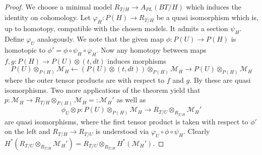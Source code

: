 \documentclass[12pt,a4paper]{article}
\theoremstyle{definition}
\begin{document}
\begin{proof}
We choose a minimal model $R_{T/H}\rightarrow A_{PL}(BT/H)$ which induces the identity on cohomology. Let $\varphi_H\colon P(H)\rightarrow R_{T/H}$ be a quasi isomorphism which is, up to homotopy, compatible with the chosen models. It admits a section $\psi_H$. Define $\varphi_U$ analogously. We note that the given map $\phi\colon P(U)\rightarrow P(H)$ is homotopic to $\phi'=\phi\circ\psi_H\circ\varphi_H$.
Now any homotopy between maps $f,g\colon P(H)\rightarrow P(U)\otimes (t,dt)$ induces morphisms
\[P(U)\otimes_{P(H)}\mathcal{M}_H\leftarrow (P(U)\otimes (t,dt))\otimes_{P(H)}\mathcal{M}_H\rightarrow P(U)\otimes_{P(H)}\mathcal{M}_H\]
where the outer tensor products are with respect to $f$ and $g$. By \cite[Theorem 6.10]{BibelI} these are quasi isomorphisms. Two more applications of the theorem yield that $p\colon \mathcal{M}_H\rightarrow R_{T/H}\otimes_{P(H)} \mathcal{M}_H=:\mathcal{M}_H'$ as well as
\[\phi_U\otimes p\colon P(U)\otimes_{P(H)}\mathcal{M}_H\rightarrow R_{T/U}\otimes_{R_{T/H}} \mathcal{M}_H'\]
 are quasi isomorphisms, where the first tensor product is taken with respect to $\phi'$ on the left and $R_{T/H}\rightarrow R_{T/U}$ is understood via $\varphi_U\circ\phi\circ\psi_H$. Clearly $H^*(R_{T/U}\otimes_{R_{T/H}} \mathcal{M}_H')= R_{T/U}\otimes_{R_{T/H}} H^*(\mathcal{M}_H')$.

\end{proof}
\end{document}
